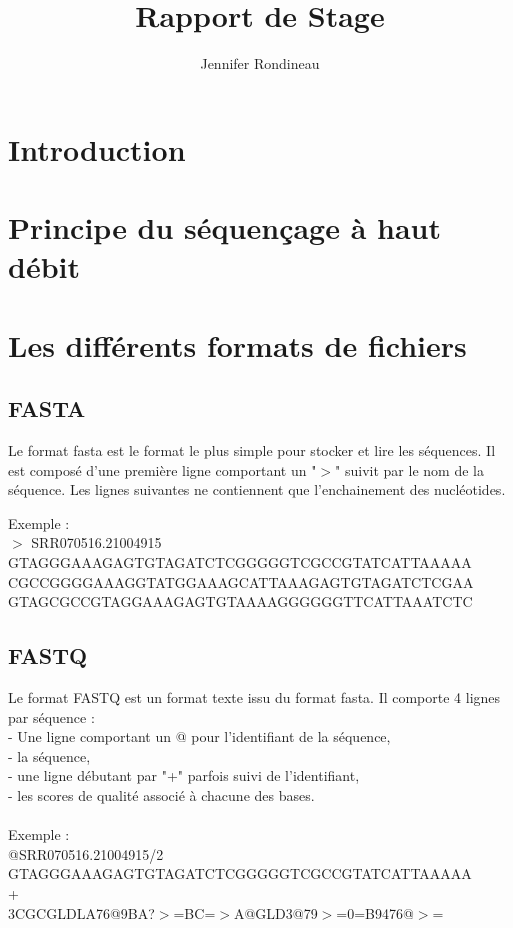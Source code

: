 \documentclass[a4paper,12pt]{article}
\title{Rapport de Stage}
\author{Jennifer Rondineau}
\begin{document}
 

\clearpage %
\renewcommand{\contentsname}{Sommaire} 
\tableofcontents{} %
\clearpage

\section{Introduction}

\section{Principe du séquençage à haut débit}

\section{Les différents formats de fichiers}

\subsection{FASTA}
Le format fasta est le format le plus simple pour stocker et lire les séquences. Il est composé d'une première ligne comportant un "$>$" suivit par le nom de la séquence. Les lignes suivantes ne contiennent que l'enchainement des nucléotides. 

Exemple : \\
$>$ SRR070516.21004915 \\
GTAGGGAAAGAGTGTAGATCTCGGGGGTCGCCGTATCATTAAAAA \\
CGCCGGGGAAAGGTATGGAAAGCATTAAAGAGTGTAGATCTCGAA \\
GTAGCGCCGTAGGAAAGAGTGTAAAAGGGGGGTTCATTAAATCTC 


\subsection{FASTQ}

Le format FASTQ est un format texte issu du format fasta. Il comporte 4 lignes par séquence : \\
- Une ligne comportant un @ pour l'identifiant de la séquence, \\
   - la séquence,  \\
   - une ligne débutant par "+" parfois suivi de l’identifiant, \\
   - les scores de qualité associé à chacune des bases. \\\\
Exemple : \\
@SRR070516.21004915/2 \\
GTAGGGAAAGAGTGTAGATCTCGGGGGTCGCCGTATCATTAAAAA \\
+ \\
3CGCGLDLA76@9BA?$>$=BC=$>$A@GLD3@79$>$=0=B9476@$>$= \\
\end{document}

